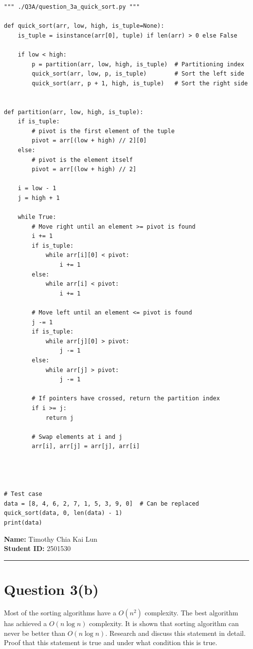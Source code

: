 \documentclass[12pt]{article}
\begin{document}
\begin{lstlisting}
""" ./Q3A/question_3a_quick_sort.py """

def quick_sort(arr, low, high, is_tuple=None):
    is_tuple = isinstance(arr[0], tuple) if len(arr) > 0 else False

    if low < high:
        p = partition(arr, low, high, is_tuple)  # Partitioning index
        quick_sort(arr, low, p, is_tuple)        # Sort the left side
        quick_sort(arr, p + 1, high, is_tuple)   # Sort the right side


def partition(arr, low, high, is_tuple):
    if is_tuple:
        # pivot is the first element of the tuple
        pivot = arr[(low + high) // 2][0]  
    else:
        # pivot is the element itself
        pivot = arr[(low + high) // 2]     

    i = low - 1
    j = high + 1

    while True:
        # Move right until an element >= pivot is found
        i += 1
        if is_tuple:
            while arr[i][0] < pivot:
                i += 1
        else:
            while arr[i] < pivot:
                i += 1

        # Move left until an element <= pivot is found
        j -= 1
        if is_tuple:
            while arr[j][0] > pivot:
                j -= 1
        else:
            while arr[j] > pivot:
                j -= 1

        # If pointers have crossed, return the partition index
        if i >= j:
            return j

        # Swap elements at i and j
        arr[i], arr[j] = arr[j], arr[i]




# Test case
data = [8, 4, 6, 2, 7, 1, 5, 3, 9, 0]  # Can be replaced
quick_sort(data, 0, len(data) - 1)
print(data)
\end{lstlisting}

\newpage
\noindent \textbf{Name:} Timothy Chia Kai Lun\\
\textbf{Student ID:} 2501530

\vspace{0.75em}
\hrule

\section{Question 3(b)}
Most of the sorting algorithms have a $O(n^2)$ complexity. The best algorithm has achieved a $O(n \log n)$ complexity. It is shown that sorting algorithm can never be better than $O(n \log n)$. Research and discuss this statement in detail. Proof that this statement is true and under what condition this is true.\\
\end{document}
